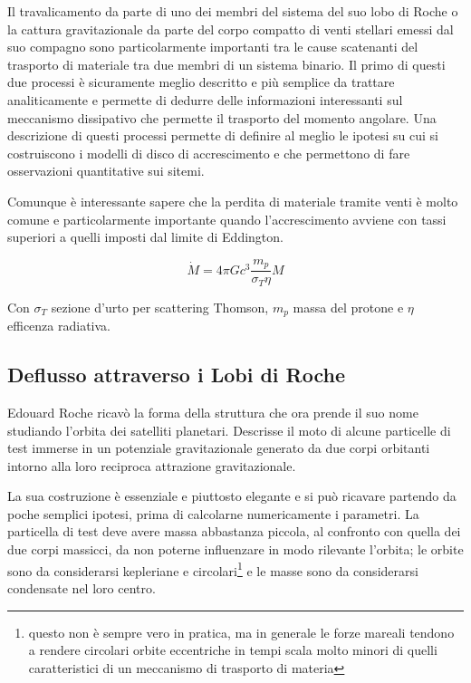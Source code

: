 \documentclass[a4paperbi]{article}
\begin{document}
	Il travalicamento da parte di uno dei membri del sistema del suo lobo di Roche o la cattura gravitazionale da parte del corpo compatto di venti stellari emessi dal suo compagno sono particolarmente importanti tra le cause scatenanti del trasporto di materiale tra due membri di un sistema binario. Il primo di questi due processi è sicuramente meglio descritto e più semplice da trattare analiticamente e permette di dedurre delle informazioni interessanti sul meccanismo dissipativo che permette il trasporto del momento angolare. Una descrizione di questi processi permette di definire al meglio le ipotesi su cui si costruiscono i modelli di disco di accrescimento e che permettono di fare osservazioni quantitative sui sitemi.
	
	Comunque è interessante sapere che la perdita di materiale tramite venti è molto comune e particolarmente importante quando l'accrescimento avviene con tassi superiori a quelli imposti dal limite di Eddington.
	
	\begin{equation}
		\dot{M}=4\pi Gc^3\frac{m_p}{\sigma_T \eta}M
	\end{equation}
	
	Con $\sigma_T$ sezione d'urto per scattering Thomson, $m_p$ massa del protone e $\eta$ efficenza radiativa.

\subsection{Deflusso attraverso i Lobi di Roche}
	Edouard Roche ricavò la forma della struttura che ora prende il suo nome studiando l'orbita dei satelliti planetari. Descrisse il moto di alcune particelle di test immerse in un potenziale gravitazionale generato da due corpi orbitanti intorno alla loro reciproca attrazione gravitazionale.
	
	La sua costruzione è essenziale e piuttosto elegante e si può ricavare partendo da poche semplici ipotesi, prima di calcolarne numericamente i parametri. La particella di test deve avere massa abbastanza piccola, al confronto con quella dei due corpi massicci, da non poterne influenzare in modo rilevante l'orbita; le orbite sono da considerarsi kepleriane e circolari\footnote{questo non è sempre vero in pratica, ma in generale le forze mareali tendono a rendere circolari orbite eccentriche in tempi scala molto minori di quelli caratteristici di un meccanismo di trasporto di materia} e le masse sono da considerarsi condensate nel loro centro.
	
\end{document}
